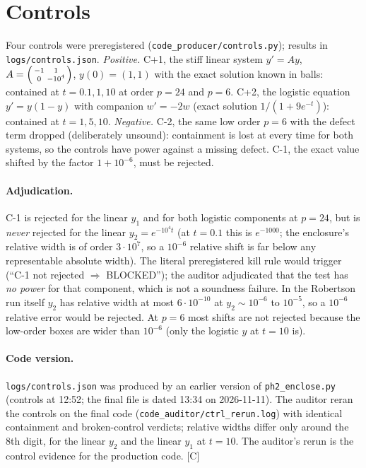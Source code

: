 \documentclass[11pt]{article}
\newcommand{\tier}[1]{\textsf{[#1]}}
\newcommand{\tC}{\tier{C}}
\theoremstyle{remark}
\begin{document}
\section{Controls}\label{sec:ctrl}
Four controls were preregistered (\texttt{code\_producer/controls.py}); results in \texttt{logs/controls.json}.
\emph{Positive.} C+1, the stiff linear system $y'=Ay$, $A=\begin{psmallmatrix}-1&1\\0&-10^4\end{psmallmatrix}$, $y(0)=(1,1)$ with the exact solution known in balls: contained at $t=0.1,1,10$ at order $p=24$ and $p=6$. C+2, the logistic equation $y'=y(1-y)$ with companion $w'=-2w$ (exact solution $1/(1+9e^{-t})$): contained at $t=1,5,10$.
\emph{Negative.} C-2, the same low order $p=6$ with the defect term dropped (deliberately unsound): containment is lost at every time for both systems, so the controls have power against a missing defect. C-1, the exact value shifted by the factor $1+10^{-6}$, must be rejected.
\paragraph{Adjudication.} C-1 is rejected for the linear $y_1$ and for both logistic components at $p=24$, but is \emph{never} rejected for the linear $y_2=e^{-10^4t}$ (at $t=0.1$ this is $e^{-1000}$; the enclosure's relative width is of order $3\cdot10^7$, so a $10^{-6}$ relative shift is far below any representable absolute width). The literal preregistered kill rule would trigger (``C-1 not rejected $\Rightarrow$ BLOCKED''); the auditor adjudicated that the test has \emph{no power} for that component, which is not a soundness failure. In the Robertson run itself $y_2$ has relative width at most $6\cdot10^{-10}$ at $y_2\sim10^{-6}$ to $10^{-5}$, so a $10^{-6}$ relative error would be rejected. At $p=6$ most shifts are not rejected because the low-order boxes are wider than $10^{-6}$ (only the logistic $y$ at $t=10$ is).
\paragraph{Code version.} \texttt{logs/controls.json} was produced by an earlier version of \texttt{ph2\_enclose.py} (controls at 12:52; the final file is dated 13:34 on 2026-11-11). The auditor reran the controls on the final code (\texttt{code\_auditor/ctrl\_rerun.log}) with identical containment and broken-control verdicts; relative widths differ only around the 8th digit, for the linear $y_2$ and the linear $y_1$ at $t=10$. The auditor's rerun is the control evidence for the production code. \tC{}
\end{document}
